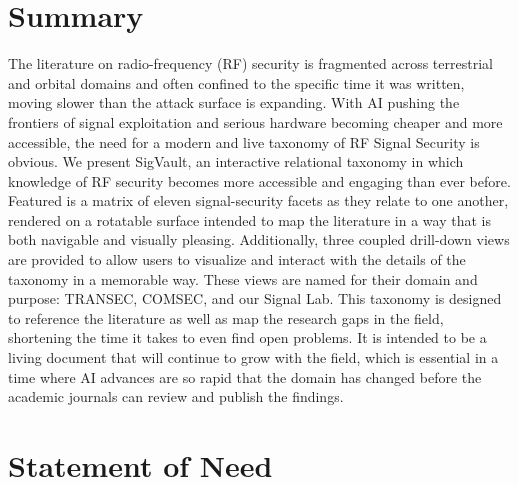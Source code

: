 \documentclass[10pt,a4paper]{article}
\newif\ifshowguides
\newcommand{\guide}[1]{%
  \ifshowguides
    {\par\smallskip\footnotesize\color{guidecol}%
     \textbf{[guide]}~#1\par\smallskip}%
  \fi}
\begin{document}
\maketitle

\section{Summary}

The literature on radio-frequency (RF) security is fragmented across
terrestrial and orbital domains and often confined to the specific time
it was written, moving slower than the attack surface is expanding. With
AI pushing the frontiers of signal exploitation and serious hardware
becoming cheaper and more accessible, the need for a modern and live
taxonomy of RF Signal Security is obvious. We present SigVault, an
interactive relational taxonomy in which knowledge of RF security becomes
more accessible and engaging than ever before. Featured is a matrix of
eleven signal-security facets as they relate to one another, rendered on
a rotatable surface intended to map the literature in a way that is both
navigable and visually pleasing. Additionally, three coupled drill-down
views are provided to allow users to visualize and interact with the
details of the taxonomy in a memorable way. These views are named for
their domain and purpose: TRANSEC, COMSEC, and our Signal Lab. This
taxonomy is designed to reference the literature as well as map the
research gaps in the field, shortening the time it takes to even find
open problems. It is intended to be a living document that will continue
to grow with the field, which is essential in a time where AI advances
are so rapid that the domain has changed before the academic journals can
review and publish the findings.

\guide{Trim to roughly 150--200 words before submission; the version
above is long on purpose so you can cut rather than invent. The sentence
that must survive intact is the one naming the contribution:
\emph{crossing} facets that prior work treats separately. Three edits
already applied from the IEEE draft: \emph{rotatble}/\emph{navigatable}/%
\emph{essentialy} spellings, and ``our proprietary Signal Lab'' ---
proprietary means closed and commercial, which contradicts the living,
citable, open instrument the rest of this paragraph argues for.}

\section{Statement of Need}
\end{document}
